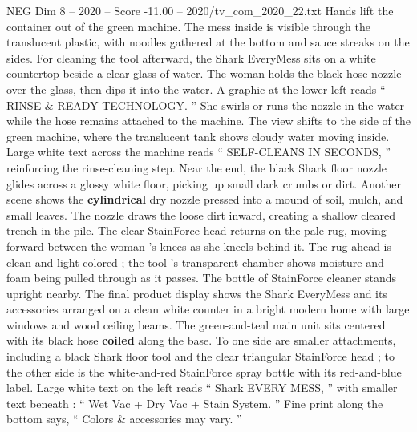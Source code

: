 \begin{textsample}{NEG Dim 8 – 2020 – Score -11.00 – 2020/tv\_com\_2020\_22.txt}
Hands lift the container out of the green machine.
The mess inside is visible through the translucent plastic, with noodles gathered at the bottom and sauce streaks on the sides.
For cleaning the tool afterward, the Shark EveryMess sits on a white countertop beside a clear glass of water.
The woman holds the black hose nozzle over the glass, then dips it into the water.
A graphic at the lower left reads “ RINSE \& READY TECHNOLOGY. ” She swirls or runs the nozzle in the water while the hose remains attached to the machine.
The view shifts to the side of the green machine, where the translucent tank shows cloudy water moving inside.
Large white text across the machine reads “ SELF-CLEANS IN SECONDS, ” reinforcing the rinse-cleaning step.
Near the end, the black Shark floor nozzle glides across a glossy white floor, picking up small dark crumbs or dirt.
Another scene shows the \textbf{cylindrical} dry nozzle pressed into a mound of soil, mulch, and small leaves.
The nozzle draws the loose dirt inward, creating a shallow cleared trench in the pile.
The clear StainForce head returns on the pale rug, moving forward between the woman ’s knees as she kneels behind it.
The rug ahead is clean and light-colored ; the tool ’s transparent chamber shows moisture and foam being pulled through as it passes.
The bottle of StainForce cleaner stands upright nearby.
The final product display shows the Shark EveryMess and its accessories arranged on a clean white counter in a bright modern home with large windows and wood ceiling beams.
The green-and-teal main unit sits centered with its black hose \textbf{coiled} along the base.
To one side are smaller attachments, including a black Shark floor tool and the clear triangular StainForce head ; to the other side is the white-and-red StainForce spray bottle with its red-and-blue label.
Large white text on the left reads “ Shark EVERY MESS, ” with smaller text beneath : “ Wet Vac + Dry Vac + Stain System. ” Fine print along the bottom says, “ Colors \& accessories may vary. ”

\end{textsample}
